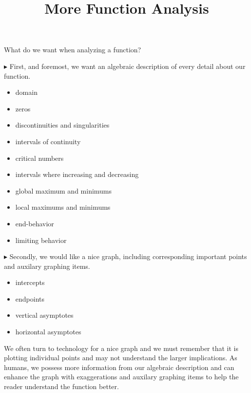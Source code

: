 \documentclass{ximera}
\title{More Function Analysis}
\begin{document}
\begin{abstract}
%
\end{abstract}
\maketitle






What do we want when analyzing a function?


$\blacktriangleright$ First, and foremost, we want an algebraic description of every detail about our function. 

\begin{itemize}
\item domain
\item zeros 
\item discontinuities and singularities
\item intervals of continuity
\item critical numbers
\item intervals where increasing and decreasing
\item global maximum and minimums
\item local maximums and minimums
\item end-behavior
\item limiting behavior
\end{itemize}



$\blacktriangleright$ Secondly, we would like a nice graph, including corresponding important points and auxilary graphing items.

\begin{itemize}
	\item intercepts
	\item endpoints
	\item vertical asymptotes
	\item horizontal asymptotes
\end{itemize}




We often turn to technology for a nice graph and we must remember that it is plotting individual points and may not understand the larger implications. As humans, we possess more information from our algebraic description and can enhance the graph with exaggerations and auxilary graphing items to help the reader understand the function better.
\end{document}
